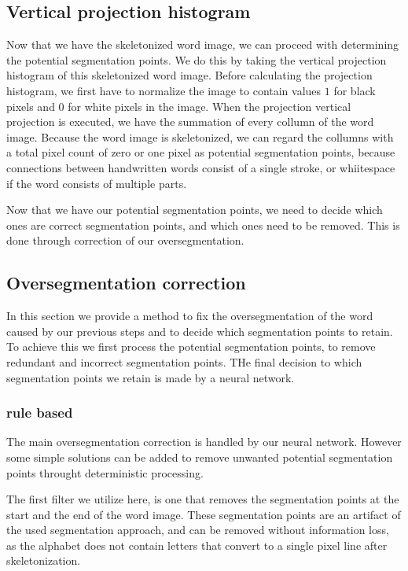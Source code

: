 \documentclass{article}
\begin{document}
\subsection{Vertical projection histogram}
Now that we have the skeletonized word image, we can proceed with determining the potential segmentation points.
We do this by taking the vertical projection histogram of this skeletonized word image.
Before calculating the projection histogram, we first have to normalize the image to contain values $1$ for black pixels and $0$ for white pixels in the image.
When the projection vertical projection is executed, we have the summation of every collumn of the word image.
Because the word image is skeletonized, we can regard the collumns with a total pixel count of zero or one pixel as potential segmentation points, because connections between handwritten words consist of a single stroke, or whiitespace if the word consists of multiple parts.

Now that we have our potential segmentation points, we need to decide which ones are correct segmentation points, and which ones need to be removed. This is done through correction of our oversegmentation.

\subsection{Oversegmentation correction}
In this section we provide a method to fix the oversegmentation of the word caused by our previous steps and to decide which segmentation points to retain.
To achieve this we first process the potential segmentation points, to remove redundant and incorrect segmentation points.
THe final decision to which segmentation points we retain is made by a neural network.

\subsubsection{rule based}
The main oversegmentation correction is handled by our neural network.
However some simple solutions can be added to remove unwanted potential segmentation points throught deterministic processing.

The first filter we utilize here, is one that removes the segmentation points at the start and the end of the word image.
These segmentation points are an artifact of the used segmentation approach, and can be removed without information loss, as the alphabet does not contain letters that convert to a single pixel line after skeletonization.
\end{document}
